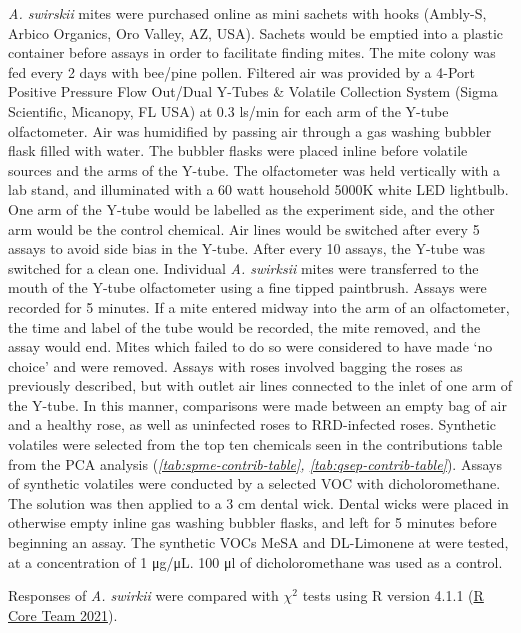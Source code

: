 \documentclass{ufdissertation}[overrideChapters] %
\begin{document}
{\emph{A. swirskii} mites were purchased online as mini sachets with hooks (Ambly-S, Arbico Organics, Oro Valley, AZ, USA). Sachets would be emptied into a plastic container before assays in order to facilitate finding mites. The mite colony was fed every 2 days with bee/pine pollen. Filtered air was provided by a 4-Port Positive Pressure Flow Out/Dual Y-Tubes \& Volatile Collection System (Sigma Scientific, Micanopy, FL USA) at 0.3 \si{\litre}s/min for each arm of the Y-tube olfactometer. Air was humidified by passing air through a gas washing bubbler flask filled with water. The bubbler flasks were placed inline before volatile sources and the arms of the Y-tube. The olfactometer was held vertically with a lab stand, and illuminated with a 60 watt household 5000K white LED lightbulb. One arm of the Y-tube would be labelled as the experiment side, and the other arm would be the control chemical. Air lines would be switched after every 5 assays to avoid side bias in the Y-tube. After every 10 assays, the Y-tube was switched for a clean one. Individual \emph{A. swirksii} mites were transferred to the mouth of the Y-tube olfactometer using a fine tipped paintbrush. Assays were recorded for 5 minutes. If a mite entered midway into the arm of an olfactometer, the time and label of the tube would be recorded, the mite removed, and the assay would end. Mites which failed to do so were considered to have made `no choice' and were removed. Assays with roses involved bagging the roses as previously described, but with outlet air lines connected to the inlet of one arm of the Y-tube. In this manner, comparisons were made between an empty bag of air and a healthy rose, as well as uninfected roses to RRD-infected roses. Synthetic volatiles were selected from the top ten chemicals seen in the contributions table from the PCA analysis (\emph{\ref{tab:spme-contrib-table}, \ref{tab:qsep-contrib-table}}). Assays of synthetic volatiles were conducted by a selected VOC with dicholoromethane. The solution was then applied to a 3 \si{\centi\metre} dental wick. Dental wicks were placed in otherwise empty inline gas washing bubbler flasks, and left for 5 minutes before beginning an assay. The synthetic VOCs MeSA and DL-Limonene at were tested, at a concentration of 1 \si{\micro\gram}/\si{\micro\liter}. 100 \si{\micro\litre} of dicholoromethane was used as a control.

Responses of \emph{A. swirkii} were compared with \(\chi^2\) tests using R version 4.1.1 (\protect\hyperlink{ref-RCT2021}{R Core Team 2021}).

}
\end{document}
